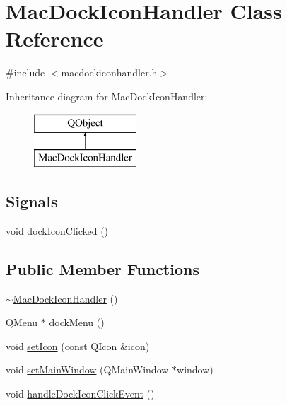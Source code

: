 \hypertarget{class_mac_dock_icon_handler}{}\section{Mac\+Dock\+Icon\+Handler Class Reference}
\label{class_mac_dock_icon_handler}


{\ttfamily \#include $<$macdockiconhandler.\+h$>$}

Inheritance diagram for Mac\+Dock\+Icon\+Handler\+:\begin{figure}[H]
\begin{center}
\leavevmode
\includegraphics[height=2.000000cm]{class_mac_dock_icon_handler}
\end{center}
\end{figure}
\subsection*{Signals}
\begin{DoxyCompactItemize}
\item 
void \hyperlink{class_mac_dock_icon_handler_ae75bf0cda7a9c1a8fbc24af59b9f0e0f}{dock\+Icon\+Clicked} ()
\end{DoxyCompactItemize}
\subsection*{Public Member Functions}
\begin{DoxyCompactItemize}
\item 
\hyperlink{class_mac_dock_icon_handler_a1253fb7e351af70d8fcf863a8833066c}{$\sim$\+Mac\+Dock\+Icon\+Handler} ()
\item 
Q\+Menu $\ast$ \hyperlink{class_mac_dock_icon_handler_a8aff3dc6410687e432f8d9314eba0ab9}{dock\+Menu} ()
\item 
void \hyperlink{class_mac_dock_icon_handler_a537f8eb3c9752089e3e2e0e30011a65b}{set\+Icon} (const Q\+Icon \&icon)
\item 
void \hyperlink{class_mac_dock_icon_handler_a4d2d18c7d56286ea745e349497941293}{set\+Main\+Window} (Q\+Main\+Window $\ast$window)
\item 
void \hyperlink{class_mac_dock_icon_handler_a38f422d9dde7df4ccfdda97b08467e0a}{handle\+Dock\+Icon\+Click\+Event} ()
\end{DoxyCompactItemize}
